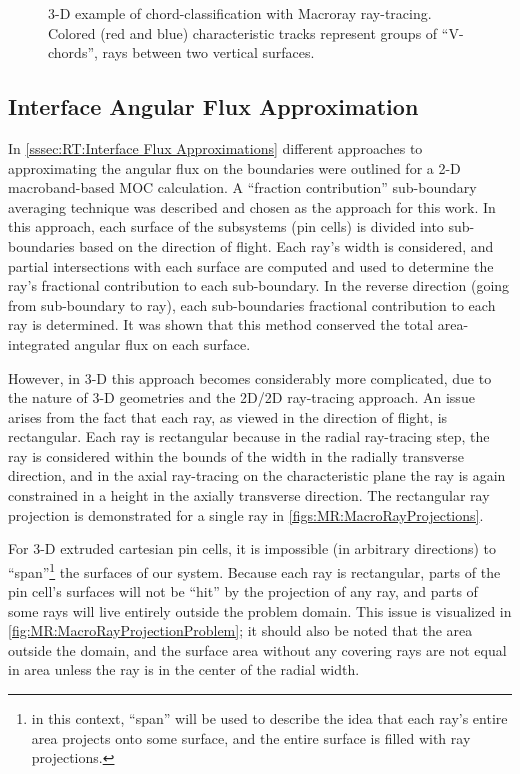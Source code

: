 {{{      \begin{figure}[h]
        \centering
        \def\svgwidth{0.45\linewidth}
        
        \caption{3-D example of chord-classification with Macroray ray-tracing. Colored (red and blue) characteristic tracks represent groups of ``V-chords'', rays between two vertical surfaces.}
        \label{fig:RT:Chord-Classification Macroray}
      \end{figure}
    }

    \subsection{Interface Angular Flux Approximation}{\label{ssec:MR:Interface Angular Flux Approximation}
      In \cref{sssec:RT:Interface Flux Approximations} different approaches to approximating the angular flux on the boundaries were outlined for a 2-D macroband-based \ac{MOC} calculation.
      A ``fraction contribution'' sub-boundary averaging technique was described and chosen as the approach for this work.
      In this approach, each surface of the subsystems (pin cells) is divided into sub-boundaries based on the direction of flight.
      Each ray's width is considered, and partial intersections with each surface are computed and used to determine the ray's fractional contribution to each sub-boundary.
      In the reverse direction (going from sub-boundary to ray), each sub-boundaries fractional contribution to each ray is determined.
      It was shown that this method conserved the total area-integrated angular flux on each surface.

      However, in 3-D this approach becomes considerably more complicated, due to the nature of 3-D geometries and the 2D/2D ray-tracing approach.
      An issue arises from the fact that each ray, as viewed in the direction of flight, is rectangular.
      Each ray is rectangular because in the radial ray-tracing step, the ray is considered within the bounds of the width in the radially transverse direction, and in the axial ray-tracing on the characteristic plane the ray is again constrained in a height in the axially transverse direction.
      The rectangular ray projection is demonstrated for a single ray in \cref{figs:MR:MacroRayProjections}.

      For 3-D extruded cartesian pin cells, it is impossible (in arbitrary directions) to ``span''\footnote{in this context, ``span'' will be used to describe the idea that each ray's entire area projects onto some surface, and the entire surface is filled with ray projections.} the surfaces of our system.
      Because each ray is rectangular, parts of the pin cell's surfaces will not be ``hit'' by the projection of any ray, and parts of some rays will live entirely outside the problem domain.
      This issue is visualized in \cref{fig:MR:MacroRayProjectionProblem}; it should also be noted that the area outside the domain, and the surface area without any covering rays are not equal in area unless the ray is in the center of the radial width.

}}}
